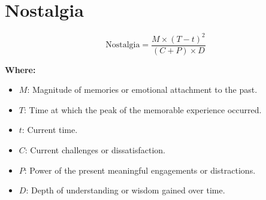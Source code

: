 \chapter{Nostalgia}

\begin{equation}
\text{Nostalgia} = \frac{M \times (T - t)^2}{(C + P) \times D}
\end{equation}

\textbf{Where:}

\begin{itemize}
    \item $M$: Magnitude of memories or emotional attachment to the past.
    \item $T$: Time at which the peak of the memorable experience occurred.
    \item $t$: Current time.
    \item $C$: Current challenges or dissatisfaction.
    \item $P$: Power of the present meaningful engagements or distractions.
    \item $D$: Depth of understanding or wisdom gained over time.
\end{itemize}